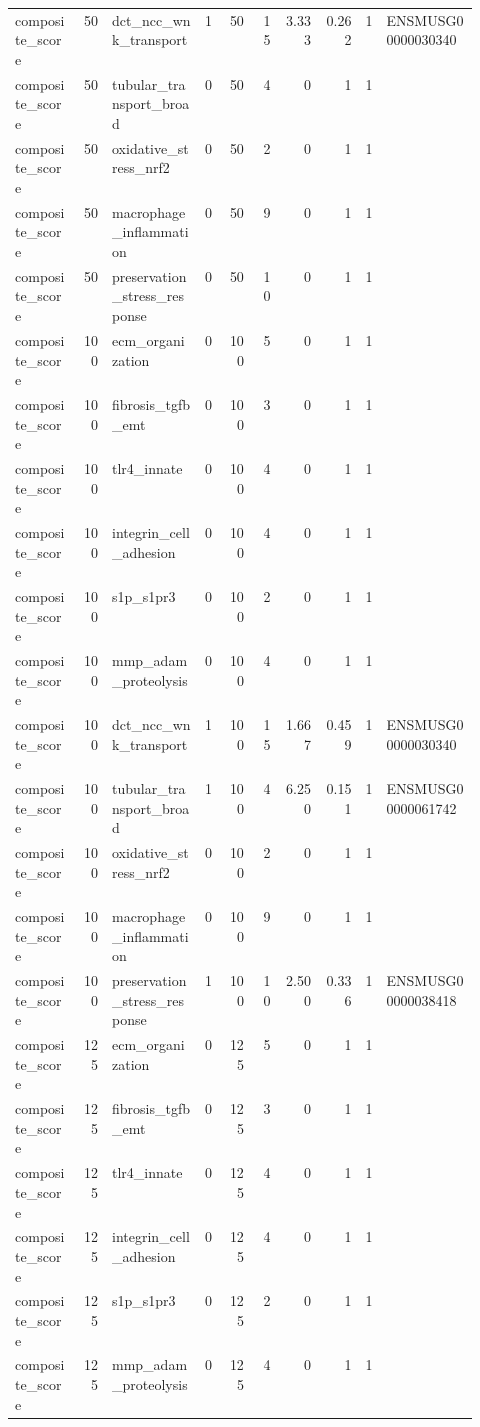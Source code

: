 \documentclass[11pt]{article}
\begin{document}
\begin{landscape}
\begin{longtable}{p{0.14\linewidth}rp{0.20\linewidth}rrrrrrp{0.20\linewidth}}
composite\_score & 50 & dct\_ncc\_wnk\_transport & 1 & 50 & 15 & 3.333 & 0.262 & 1 & ENSMUSG00000030340 \\
composite\_score & 50 & tubular\_transport\_broad & 0 & 50 & 4 & 0 & 1 & 1 &  \\
composite\_score & 50 & oxidative\_stress\_nrf2 & 0 & 50 & 2 & 0 & 1 & 1 &  \\
composite\_score & 50 & macrophage\_inflammation & 0 & 50 & 9 & 0 & 1 & 1 &  \\
composite\_score & 50 & preservation\_stress\_response & 0 & 50 & 10 & 0 & 1 & 1 &  \\
composite\_score & 100 & ecm\_organization & 0 & 100 & 5 & 0 & 1 & 1 &  \\
composite\_score & 100 & fibrosis\_tgfb\_emt & 0 & 100 & 3 & 0 & 1 & 1 &  \\
composite\_score & 100 & tlr4\_innate & 0 & 100 & 4 & 0 & 1 & 1 &  \\
composite\_score & 100 & integrin\_cell\_adhesion & 0 & 100 & 4 & 0 & 1 & 1 &  \\
composite\_score & 100 & s1p\_s1pr3 & 0 & 100 & 2 & 0 & 1 & 1 &  \\
composite\_score & 100 & mmp\_adam\_proteolysis & 0 & 100 & 4 & 0 & 1 & 1 &  \\
composite\_score & 100 & dct\_ncc\_wnk\_transport & 1 & 100 & 15 & 1.667 & 0.459 & 1 & ENSMUSG00000030340 \\
composite\_score & 100 & tubular\_transport\_broad & 1 & 100 & 4 & 6.250 & 0.151 & 1 & ENSMUSG00000061742 \\
composite\_score & 100 & oxidative\_stress\_nrf2 & 0 & 100 & 2 & 0 & 1 & 1 &  \\
composite\_score & 100 & macrophage\_inflammation & 0 & 100 & 9 & 0 & 1 & 1 &  \\
composite\_score & 100 & preservation\_stress\_response & 1 & 100 & 10 & 2.500 & 0.336 & 1 & ENSMUSG00000038418 \\
composite\_score & 125 & ecm\_organization & 0 & 125 & 5 & 0 & 1 & 1 &  \\
composite\_score & 125 & fibrosis\_tgfb\_emt & 0 & 125 & 3 & 0 & 1 & 1 &  \\
composite\_score & 125 & tlr4\_innate & 0 & 125 & 4 & 0 & 1 & 1 &  \\
composite\_score & 125 & integrin\_cell\_adhesion & 0 & 125 & 4 & 0 & 1 & 1 &  \\
composite\_score & 125 & s1p\_s1pr3 & 0 & 125 & 2 & 0 & 1 & 1 &  \\
composite\_score & 125 & mmp\_adam\_proteolysis & 0 & 125 & 4 & 0 & 1 & 1 &  \\

\end{longtable}
\end{landscape}
\end{document}
